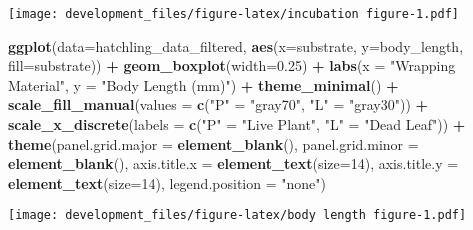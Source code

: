 \documentclass[
]{article}
\newenvironment{Shaded}{\begin{snugshade}}{\end{snugshade}}
\newcommand{\AttributeTok}[1]{\textcolor[rgb]{0.13,0.29,0.53}{#1}}
\newcommand{\DecValTok}[1]{\textcolor[rgb]{0.00,0.00,0.81}{#1}}
\newcommand{\FloatTok}[1]{\textcolor[rgb]{0.00,0.00,0.81}{#1}}
\newcommand{\FunctionTok}[1]{\textcolor[rgb]{0.13,0.29,0.53}{\textbf{#1}}}
\newcommand{\NormalTok}[1]{#1}
\newcommand{\OtherTok}[1]{\textcolor[rgb]{0.56,0.35,0.01}{#1}}
\newcommand{\SpecialCharTok}[1]{\textcolor[rgb]{0.81,0.36,0.00}{\textbf{#1}}}
\newcommand{\StringTok}[1]{\textcolor[rgb]{0.31,0.60,0.02}{#1}}
\begin{document}
\texttt{[image: development\_files/figure-latex/incubation figure-1.pdf]}

\begin{Shaded}
\begin{Highlighting}[]
\FunctionTok{ggplot}\NormalTok{(}\AttributeTok{data=}\NormalTok{hatchling\_data\_filtered, }\FunctionTok{aes}\NormalTok{(}\AttributeTok{x=}\NormalTok{substrate, }\AttributeTok{y=}\NormalTok{body\_length, }\AttributeTok{fill=}\NormalTok{substrate)) }\SpecialCharTok{+}
  \FunctionTok{geom\_boxplot}\NormalTok{(}\AttributeTok{width=}\FloatTok{0.25}\NormalTok{) }\SpecialCharTok{+}
  \FunctionTok{labs}\NormalTok{(}\AttributeTok{x =} \StringTok{"Wrapping Material"}\NormalTok{, }\AttributeTok{y =} \StringTok{"Body Length (mm)"}\NormalTok{) }\SpecialCharTok{+}
  \FunctionTok{theme\_minimal}\NormalTok{() }\SpecialCharTok{+}
  \FunctionTok{scale\_fill\_manual}\NormalTok{(}\AttributeTok{values =} \FunctionTok{c}\NormalTok{(}\StringTok{"P"} \OtherTok{=} \StringTok{"gray70"}\NormalTok{, }\StringTok{"L"} \OtherTok{=} \StringTok{"gray30"}\NormalTok{)) }\SpecialCharTok{+} 
  \FunctionTok{scale\_x\_discrete}\NormalTok{(}\AttributeTok{labels =} \FunctionTok{c}\NormalTok{(}\StringTok{"P"} \OtherTok{=} \StringTok{"Live Plant"}\NormalTok{, }\StringTok{"L"} \OtherTok{=} \StringTok{"Dead Leaf"}\NormalTok{)) }\SpecialCharTok{+}
  \FunctionTok{theme}\NormalTok{(}\AttributeTok{panel.grid.major =} \FunctionTok{element\_blank}\NormalTok{(),}
        \AttributeTok{panel.grid.minor =} \FunctionTok{element\_blank}\NormalTok{(),}
        \AttributeTok{axis.title.x =} \FunctionTok{element\_text}\NormalTok{(}\AttributeTok{size=}\DecValTok{14}\NormalTok{),}
        \AttributeTok{axis.title.y =} \FunctionTok{element\_text}\NormalTok{(}\AttributeTok{size=}\DecValTok{14}\NormalTok{),}
        \AttributeTok{legend.position =} \StringTok{"none"}\NormalTok{)}
\end{Highlighting}
\end{Shaded}

\texttt{[image: development\_files/figure-latex/body length figure-1.pdf]}
\end{document}
